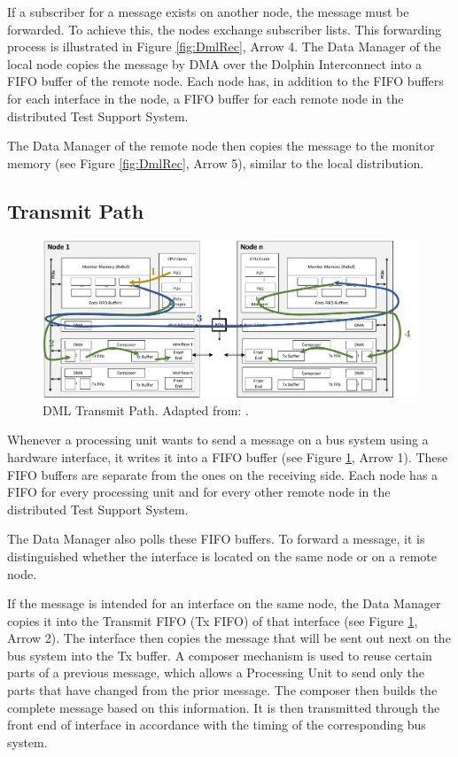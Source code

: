 If a subscriber for a message exists on another node, the message must be forwarded. To achieve this, the nodes exchange subscriber lists. This forwarding process is illustrated in Figure \ref{fig:DmlRec}, Arrow 4. The Data Manager of the local node copies the message by DMA over the Dolphin Interconnect into a FIFO buffer of the remote node. Each node has, in addition to the FIFO buffers for each interface in the node, a FIFO buffer for each remote node in the distributed Test Support System.

The Data Manager of the remote node then copies the message to the monitor memory (see Figure \ref{fig:DmlRec}, Arrow 5), similar to the local distribution.

\subsection{Transmit Path}

\begin{figure}[h!]
    \centering
    \includegraphics[width=1\linewidth]{figures/dml/dml03.pdf}
    \caption[DML Transmit Path]{DML Transmit Path. Adapted from: \cite{dml01}.}
    \label{fig:DmlTrans}
\end{figure}

Whenever a processing unit wants to send a message on a bus system using a hardware interface, it writes it into a FIFO buffer (see Figure \ref{fig:DmlTrans}, Arrow 1). These FIFO buffers are separate from the ones on the receiving side. Each node has a FIFO for every processing unit and for every other remote node in the distributed Test Support System.

The Data Manager also polls these FIFO buffers. To forward a message, it is distinguished whether the interface is located on the same node or on a remote node.

If the message is intended for an interface on the same node, the Data Manager copies it into the Transmit FIFO (Tx FIFO) of that interface (see Figure \ref{fig:DmlTrans}, Arrow 2). The interface then copies the message that will be sent out next on the bus system into the Tx buffer. A composer mechanism is used to reuse certain parts of a previous message, which allows a Processing Unit to send only the parts that have changed from the prior message. The composer then builds the complete message based on this information. It is then transmitted through the front end of interface in accordance with the timing of the corresponding bus system.

